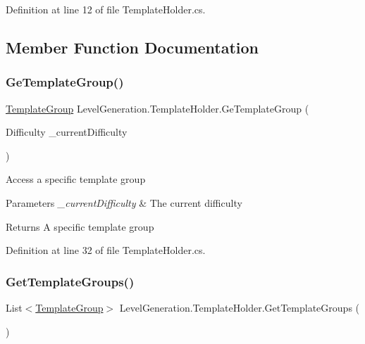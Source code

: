 Definition at line 12 of file Template\+Holder.\+cs.



\subsection{Member Function Documentation}
\mbox{\label{class_level_generation_1_1_template_holder_ad2e43ac2d95bff2cc2ac9afdc9cccc8e}} 
\subsubsection{\texorpdfstring{Ge\+Template\+Group()}{GeTemplateGroup()}}
{\footnotesize\ttfamily \mbox{\hyperlink{class_level_generation_1_1_template_group}{Template\+Group}} Level\+Generation.\+Template\+Holder.\+Ge\+Template\+Group (\begin{DoxyParamCaption}\item[{Difficulty}]{\+\_\+current\+Difficulty }\end{DoxyParamCaption})}



Access a specific template group 


\begin{DoxyParams}{Parameters}
{\em \+\_\+current\+Difficulty} & The current difficulty\\
\hline
\end{DoxyParams}
\begin{DoxyReturn}{Returns}
A specific template group
\end{DoxyReturn}


Definition at line 32 of file Template\+Holder.\+cs.

\mbox{\label{class_level_generation_1_1_template_holder_a7bf3b585f3b2a6de8b5c0b32f34786ce}} 
\subsubsection{\texorpdfstring{Get\+Template\+Groups()}{GetTemplateGroups()}}
{\footnotesize\ttfamily List$<$\mbox{\hyperlink{class_level_generation_1_1_template_group}{Template\+Group}}$>$ Level\+Generation.\+Template\+Holder.\+Get\+Template\+Groups (\begin{DoxyParamCaption}{ }\end{DoxyParamCaption})}



